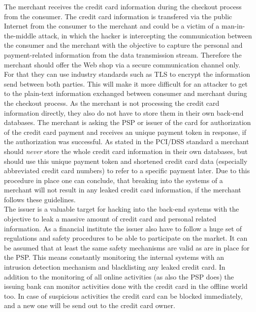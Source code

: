 The merchant receives the credit card information during the checkout process from the consumer. The credit card information is transfered via the public Internet from the consumer to the merchant and could be a victim of a man-in-the-middle attack, in which the hacker is intercepting the communication between the consumer and the merchant with the objective to capture the personal and payment-related information from the data transmission stream. Therefore the merchant should offer the Web shop via a secure communication channel only. For that they can use industry standards such as \gls{TLS} to encrypt the information send between both parties. This will make it more difficult for an attacker to get to the plain-text information exchanged between consumer and merchant during the checkout process. As the merchant is not processing the credit card information directly, they also do not have to store them in their own back-end databases. The merchant is asking the \gls{PSP} or issuer of the card for authorization of the credit card payment and receives an unique payment token in response, if the authorization was successful. As stated in the \gls{PCI/DSS} standard \citep{virtue2009payment} a merchant should \emph{never} store the whole credit card information in their own databases, but should use this unique payment token and shortened credit card data (especially abbreviated credit card numbers) to refer to a specific payment later. Due to this procedure in place one can conclude, that breaking into the systems of a merchant will not result in any leaked credit card information, if the merchant follows these guidelines. \\

The issuer is a valuable target for hacking into the back-end systems with the objective to leak a massive amount of credit card and personal related information. As a financial institute the issuer also have to follow a huge set of regulations and safety procedures to be able to participate on the market. It can be assumed that at least the same safety mechanisms are valid as are in place for the \gls{PSP}. This means constantly monitoring the internal systems with an intrusion detection mechanism and blacklisting any leaked credit card. In addition to the monitoring of all online activities (as also the \gls{PSP} does) the issuing bank can monitor activities done with the credit card in the offline world too. In case of suspicious activities the credit card can be blocked immediately, and a new one will be send out to the credit card owner. \\

